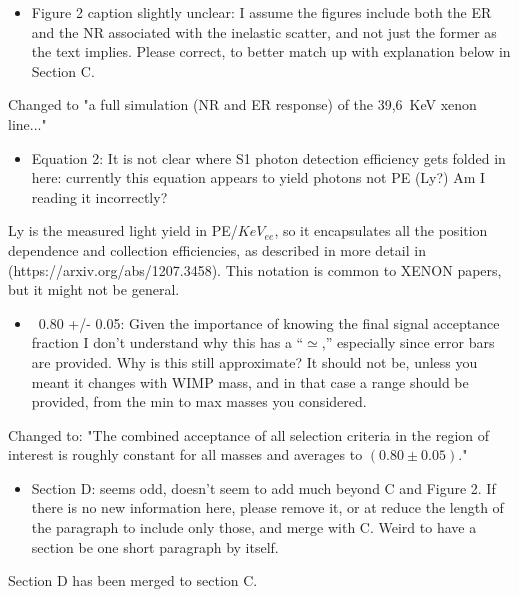\documentclass{article}
\begin{document}
\begin{itemize}
	\item {\color{blue} 
Figure 2 caption slightly unclear: I assume the figures include both
the ER and the NR associated with the inelastic scatter, and not just
the former as the text implies. Please correct, to better match up
with explanation below in Section C.}
\end{itemize}

Changed to "a full simulation (NR and ER response) of the 39,6~KeV xenon line..." 

\begin{itemize}
	\item {\color{blue} 
Equation 2: It is not clear where S1 photon detection efficiency gets
folded in here: currently this equation appears to yield photons not
PE (Ly?) Am I reading it incorrectly?}
\end{itemize}

Ly is the measured light yield in PE/$KeV_{ee}$, so it encapsulates all the position dependence
and collection efficiencies, as described in more detail in 
(https://arxiv.org/abs/1207.3458). This notation is common to XENON papers, but it might not be 
general.


\begin{itemize}
	\item {\color{blue} 
~0.80 +/- 0.05: Given the importance of knowing the final signal
acceptance fraction I don’t understand why this has a “$\simeq$,” especially
since error bars are provided. Why is this still approximate? It
should not be, unless you meant it changes with WIMP mass, and in that
case a range should be provided, from the min to max masses you
considered.}
\end{itemize}

Changed to: "The combined acceptance  of all selection criteria in the region 
of interest is roughly constant for all masses and averages to $(0.80\pm0.05)$."



\begin{itemize}
	\item {\color{blue} 
Section D: seems odd, doesn’t seem to add much beyond C and Figure 2.
If there is no new information here, please remove it, or at reduce
the length of the paragraph to include only those, and merge with C.
Weird to have a section be one short paragraph by itself.}
\end{itemize}


Section D has been merged to section C.
\end{document}
